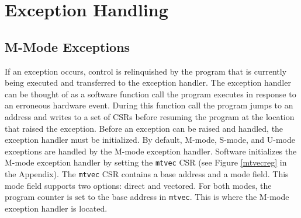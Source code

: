 \documentclass[12pt]{article}
\begin{document}
\section{Exception Handling}
\subsection{M-Mode Exceptions}
If an exception occurs, control is relinquished by the program that is currently being executed and transferred to the exception handler. The exception handler can be thought of as a software function call the program executes in response to an erroneous hardware event. During this function call the program jumps to an address and writes to a set of CSRs before resuming the program at the location that raised the exception. Before an exception can be raised and handled, the exception handler must be initialized. By default, M-mode, S-mode, and U-mode exceptions are handled by the M-mode exception handler. Software initializes the M-mode exception handler by setting the {\tt{mtvec}} CSR (see Figure \ref{mtvecreg} in the Appendix). The {\tt{mtvec}} CSR contains a base address and a mode field. This mode field supports two options: direct and vectored. For both modes, the program counter is set to the base address in {\tt{mtvec}}. This is where the M-mode exception handler is located.
\end{document}

